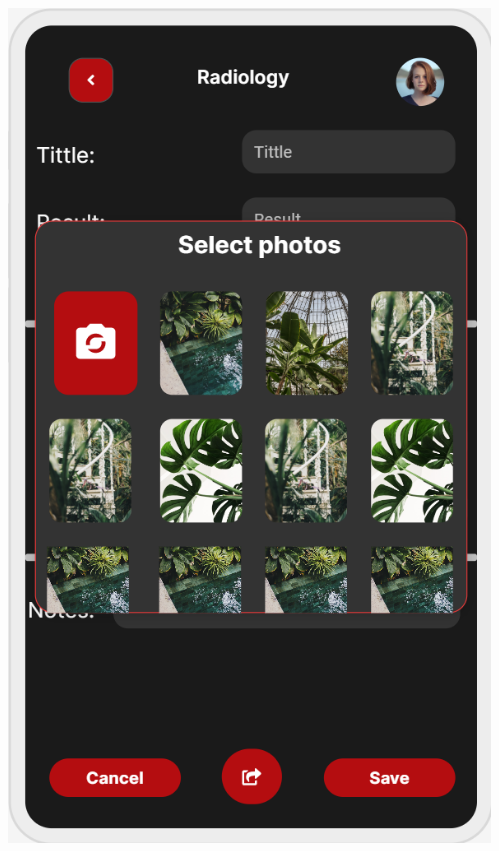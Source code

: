 \documentclass[14pt]{beamer}
\begin{document}
\begin{frame}
\begin{columns}
\begin{column}{0.5\textwidth}
\begin{center}
\end{center}
\end{column}
\begin{column}{0.5\textwidth}
\begin{center}

\includegraphics[scale = 0.48]{Images/RadiologyP.png}

\end{center}
\end{column}
\end{columns}


\end{frame}
\end{document}
